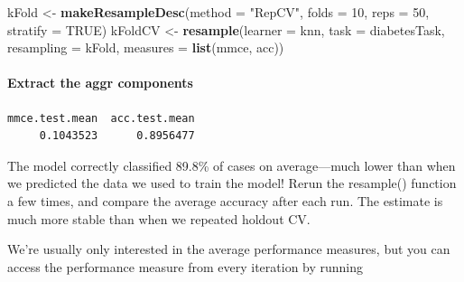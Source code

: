 \documentclass[
]{article}
\newenvironment{Shaded}{\begin{snugshade}}{\end{snugshade}}
\newcommand{\AttributeTok}[1]{\textcolor[rgb]{0.13,0.29,0.53}{#1}}
\newcommand{\ConstantTok}[1]{\textcolor[rgb]{0.56,0.35,0.01}{#1}}
\newcommand{\DecValTok}[1]{\textcolor[rgb]{0.00,0.00,0.81}{#1}}
\newcommand{\FunctionTok}[1]{\textcolor[rgb]{0.13,0.29,0.53}{\textbf{#1}}}
\newcommand{\NormalTok}[1]{#1}
\newcommand{\OtherTok}[1]{\textcolor[rgb]{0.56,0.35,0.01}{#1}}
\newcommand{\SpecialCharTok}[1]{\textcolor[rgb]{0.81,0.36,0.00}{\textbf{#1}}}
\newcommand{\StringTok}[1]{\textcolor[rgb]{0.31,0.60,0.02}{#1}}
\begin{document}
\begin{Shaded}
\begin{Highlighting}[]
\NormalTok{kFold }\OtherTok{\textless{}{-}} \FunctionTok{makeResampleDesc}\NormalTok{(}\AttributeTok{method =} \StringTok{"RepCV"}\NormalTok{, }\AttributeTok{folds =} \DecValTok{10}\NormalTok{, }\AttributeTok{reps =} \DecValTok{50}\NormalTok{,}
                          \AttributeTok{stratify =} \ConstantTok{TRUE}\NormalTok{)}
\NormalTok{kFoldCV }\OtherTok{\textless{}{-}} \FunctionTok{resample}\NormalTok{(}\AttributeTok{learner =}\NormalTok{ knn, }\AttributeTok{task =}\NormalTok{ diabetesTask,}
                    \AttributeTok{resampling =}\NormalTok{ kFold, }\AttributeTok{measures =} \FunctionTok{list}\NormalTok{(mmce, acc))}
\end{Highlighting}
\end{Shaded}

\paragraph{Extract the aggr
components}\label{extract-the-aggr-components}

\begin{Shaded}
\end{Shaded}

\begin{verbatim}
mmce.test.mean  acc.test.mean 
     0.1043523      0.8956477 
\end{verbatim}

The model correctly classified 89.8\% of cases on average---much lower
than when we predicted the data we used to train the model! Rerun the
resample() function a few times, and compare the average accuracy after
each run. The estimate is much more stable than when we repeated holdout
CV.

We're usually only interested in the average performance measures, but
you can access the performance measure from every iteration by running

\begin{Shaded}
\end{Shaded}
\end{document}
